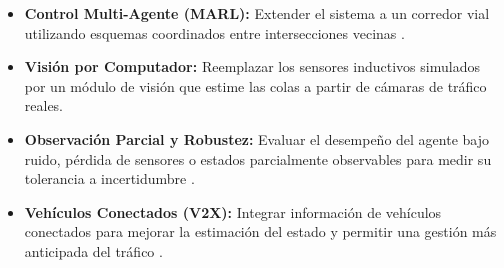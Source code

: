 \begin{itemize}
    \item \textbf{Control Multi-Agente (MARL):} Extender el sistema a un corredor vial utilizando esquemas coordinados entre intersecciones vecinas \cite{marl_chu2020,haps_ppo2025}.
    \item \textbf{Visión por Computador:} Reemplazar los sensores inductivos simulados por un módulo de visión que estime las colas a partir de cámaras de tráfico reales.
    \item \textbf{Observación Parcial y Robustez:} Evaluar el desempeño del agente bajo ruido, pérdida de sensores o estados parcialmente observables para medir su tolerancia a incertidumbre \cite{robust_tan2020}.
    \item \textbf{Vehículos Conectados (V2X):} Integrar información de vehículos conectados para mejorar la estimación del estado y permitir una gestión más anticipada del tráfico \cite{connected_long2022}.
\end{itemize}

